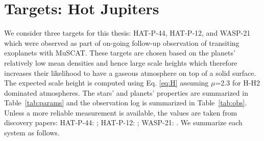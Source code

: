 \section{Targets: Hot Jupiters}\label{sec:targets}
We consider three targets for this thesis: HAT-P-44, HAT-P-12, and WASP-21 which were observed as part of on-going follow-up observation of transiting exoplanets with MuSCAT. 
These targets are chosen based on the planets' relatively low mean densities and hence large scale heights which therefore increases their likelihood to have a gaseous atmosphere on top of a solid surface. The expected scale height is computed using Eq. \ref{eq:H} assuming $\mu$=2.3 for H-H2 dominated atmospheres. %
The stars' and planets' properties are summarized in Table~\ref{tab:params} and the observation log is summarized in Table~\ref{tab:obs}. Unless a more reliable measurement is available, the values are taken from discovery papers: HAT-P-44: \cite{Hartmann2014}; HAT-P-12: \cite{Hartmann2009}; WASP-21: \cite{Bouchy2010}. We summarize each system as follows.

